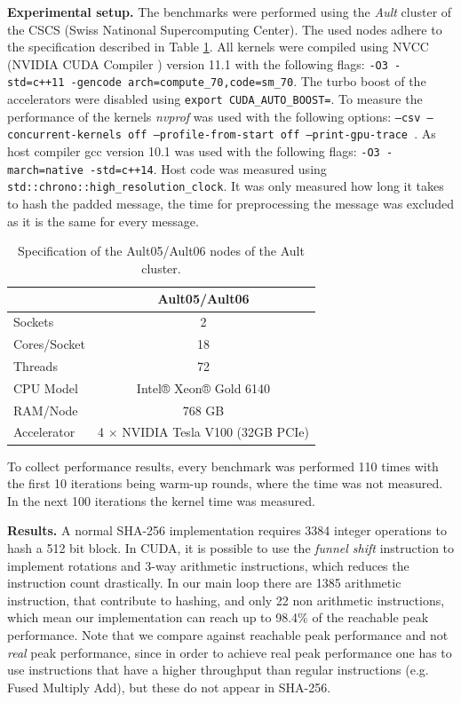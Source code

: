 \documentclass[letterpaper]{article}
\newcommand{\mypar}[1]{{\bf #1.}}
\begin{document}
\mypar{Experimental setup} The benchmarks were performed using the \emph{Ault} cluster of the CSCS (Swiss Natinonal Supercomputing Center). The used nodes adhere to the specification described in Table \ref{table:Ault}.
All kernels were compiled using NVCC (NVIDIA CUDA Compiler \cite{nvcc}) version 11.1 with the following flags: \texttt{-O3 -std=c++11 -gen\-code arch=compute\_70,code=sm\_70}.
The  turbo  boost  of  the  accelerators  were  disabled  using \texttt{export \- CUDA\-\_\-AUTO\-\_\-BOOST\-=}.
To measure the performance of the kernels \emph{nvprof} \cite{nvprof} was used with the following options: \texttt{--csv --con\-current-\-kernels off  --profile\--from\--start off --print\--gpu\--trace }. As host compiler gcc \cite{gcc} version 10.1 was used with the following flags: \texttt{-O3 -march=native -std=c++14}. Host code was measured using \texttt{std\-::\-chrono\-::\-high\-\_\-re\-so\-lu\-ti\-on\-\-\_\-clock}. 
It was only measured how long it takes to hash the padded message, the time for preprocessing the message was excluded as it is the same for every message.


\begin{table}[h]
\centering
\caption{Specification of the Ault05/Ault06 nodes of the Ault cluster.\label{table:Ault}\\
}
\begin{tabularx}{\linewidth}{ l c }
\toprule
& Ault05/Ault06  \\
\midrule
Sockets & 2  \\
Cores/Socket & 18\\
Threads & 72 \\
CPU Model & Intel® Xeon® Gold 6140  \\
RAM/Node & 768 GB \\
Accelerator & 4 $\times$ NVIDIA Tesla V100 (32GB PCIe) \\
\bottomrule
\end{tabularx}
\end{table}

To collect performance results, every benchmark was performed 110 times with the first 10 iterations being warm-up rounds, where the time was not measured. In the next 100 iterations the kernel time was measured.

\mypar{Results}
A normal SHA-256 implementation requires 3384 integer operations to hash a 512 bit block.
In CUDA, it is possible to use the \emph{funnel shift} instruction to implement rotations and 3-way arithmetic instructions, which reduces the instruction count drastically. In our main loop there are 1385 arithmetic instruction, that contribute to hashing, and only 22 non arithmetic instructions, which mean our implementation can reach up to 98.4\% of the reachable peak performance. Note that we compare against reachable peak performance and not \emph{real} peak performance, since in order to achieve real peak performance one has to use instructions that have a higher throughput than regular instructions (e.g. Fused Multiply Add), but these do not appear in SHA-256.
\end{document}
